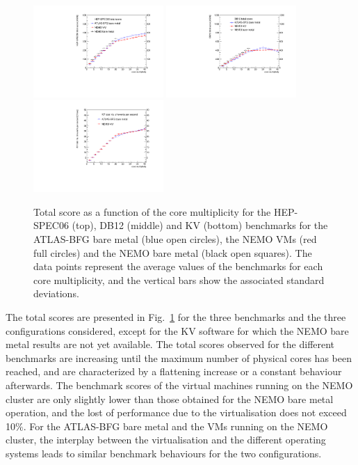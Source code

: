 \begin{figure}[htbp]
\centering
\includegraphics[width=0.44\textwidth]{figures/benchmark-hepspec06-total.pdf}
\includegraphics[width=0.44\textwidth]{figures/DB12-BFG-BM-NEMO-VM-NEMO-BM-total.pdf} 
\includegraphics[width=0.44\textwidth]{figures/kv-BFG-BM-NEMO-VM-NEMO-BM-total.pdf} 
\caption{Total score as a function of the core multiplicity for the HEP-SPEC06 (top), DB12 (middle) and KV (bottom) benchmarks
for the ATLAS-BFG bare metal (blue open circles), the NEMO VMs (red full circles) and the NEMO bare metal (black open squares). The data points represent
the average values of the benchmarks for each core multiplicity, and the vertical bars show the associated standard deviations.}
\label{bmk-total}
\end{figure}

The total scores are presented in Fig.~\ref{bmk-total} for the three benchmarks and the three configurations considered, except for the KV software for which the NEMO bare metal
results are not yet available. The total scores observed for the different benchmarks are increasing until the maximum number of physical cores has been reached, and are characterized by a flattening increase
or a constant behaviour afterwards. The benchmark scores of the virtual machines running on the NEMO cluster are only slightly lower than those obtained for the NEMO bare metal operation, and the lost of performance
due to the virtualisation does not exceed 10$\%$. For the ATLAS-BFG bare metal and the VMs running on the NEMO cluster, the interplay between the virtualisation and the different operating systems leads
to similar benchmark behaviours for the two configurations.

